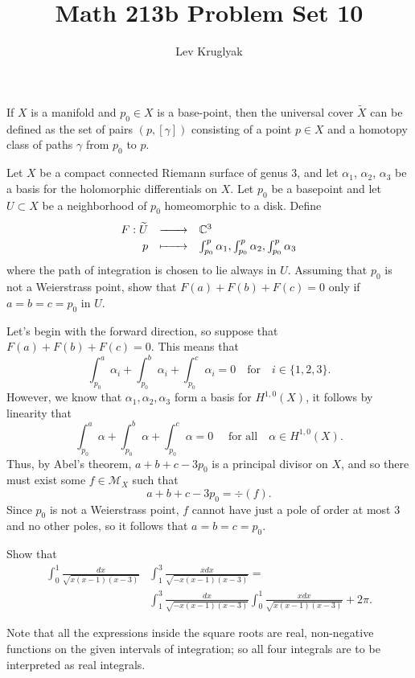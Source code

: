 \documentclass[expanded]{lkx_pset}
\title{Math 213b Problem Set 10}
\author{Lev Kruglyak}
\begin{document}
\maketitle

\begin{problem}{1}
If $X$ is a manifold and $p_{0}\in X$ is a base-point, then the universal cover $\widetilde X$ can be defined as the set of pairs $(p, [\gamma])$ consisting of a point $p\in X$ and a homotopy class of paths $\gamma$ from $p_{0}$ to $p$.
\end{problem}
\begin{parts}
	\begin{part}{}
		Let $X$ be a compact connected Riemann surface of genus $3$, and let
		$\alpha_{1}$, $\alpha_{2}$, $\alpha_{3}$ be a basis for the
		holomorphic differentials on $X$. Let $p_{0}$ be a basepoint and
		let $U\subset X$ be a neighborhood of $p_{0}$ homeomorphic to a disk.
		Define
		\[
			\definefunction{F}{\widetilde{U}}{\C^3}{p}{ \int_{p_{0}}^{p} \alpha_{1}, \int_{p_{0}}^{p} \alpha_{2},  \int_{p_{0}}^{p} \alpha_{3}}
		\]
		where the path of integration is chosen to lie always in $U$.
		Assuming that $p_{0}$ is not a Weierstrass point, show that
		$F(a)+F(b)+F(c) =0$ only if $a=b=c=p_{0}$ in $U$.
	\end{part}

	Let's begin with the forward direction, so suppose that $F(a)+F(b)+F(c)=0$. This means that
	\[
		\int_{p_0}^a\alpha_i + \int_{p_0}^b\alpha_i + \int_{p_0}^c \alpha_i = 0\quad\textrm{for}\quad i\in \{1,2,3\}.
	\]
	However, we know that $\alpha_1,\alpha_2,\alpha_3$ form a basis for $H^{1,0}(X)$, it follows by linearity that
	\[
		\int_{p_0}^a \alpha + \int_{p_0}^b\alpha + \int_{p_0}^c \alpha = 0\quad\textrm{ for all}\quad \alpha\in H^{1,0}(X).
	\]
	Thus, by Abel's theorem, $a+b+c-3p_0$ is a principal divisor on $X$, and so there must exist some $f\in \mathcal{M}_X$ such that
	\[
		a+ b+c-3p_0 = \div(f).
	\]
	Since $p_0$ is not a Weierstrass point, $f$ cannot have just a pole of order at most $3$ and no other poles, so it follows that $a=b=c=p_0$.
\end{parts}

\begin{problem}{2}
Show that
\begin{align*}
	\int_0^1 \frac{dx}{\sqrt{x(x-1)(x-3)}}
	 & \int_1^3 \frac{x dx}{\sqrt{-x(x-1)(x-3)}} = \\
	 & \int_1^3 \frac{dx}{\sqrt{-x(x-1)(x-3)}}
	\int_0^1 \frac{x dx}{\sqrt{x(x-1)(x-3)}} + 2\pi.
\end{align*}

Note that all the expressions inside the square roots are real,
non-negative functions on the given intervals of integration;
so all four integrals are to be interpreted as real integrals.
\end{problem}
\end{document}
